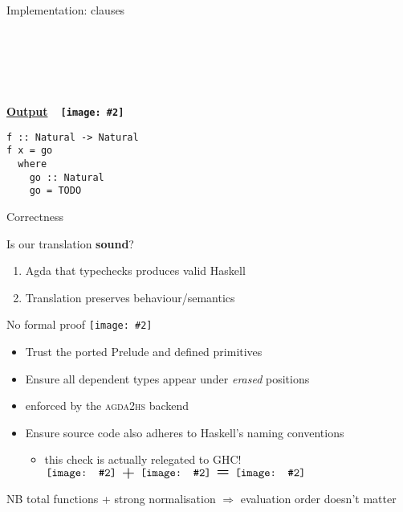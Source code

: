 \documentclass[aspectratio=169]{beamer}
\newcommand\agdatohs{\textsc{agda2hs}\xspace}
\newcommand\img[2]{\texttt{[image: \#2]}}
\newcommand\smallImg[1]{\img{1.7em}{#1}}
\newcommand*\vmid[1]{\vcenter{\hbox{#1}}}
\newcommand\agdaHsLove{%
$
\vmid{\smallImg{agda}}
\vmid{\scalebox{1.5}{\ +\ }}
\vmid{\smallImg{haskell}}
\vmid{\scalebox{1.5}{\ =\ }}
\vmid{\smallImg{heart}}
$
}
\newcommand\resetVars{
  \def\sourceRatio{.5}
  \def\zoom{1}
  \def\hsFontsize{\normalsize}
  \def\midruleL{-1cm}
  \def\midruleR{.5cm}
  \def\sourceIcon{agda}
}
\newcommand\midrule{\hspace{\midruleL}\vrule\hspace{\midruleR}}
\begin{document}
\begin{frame}[fragile]{Implementation:  clauses}
\begin{minipage}{.33\textwidth}
\begin{code}[hide]%
\>[0]\AgdaSpace{}%
\AgdaSpace{}%
\<%
\end{code}
\begin{code}%
\>[0][@{}l@{\AgdaIndent{1}}]%
\>[2]\AgdaSpace{}%
\AgdaSymbol{:}\AgdaSpace{}%
\AgdaSpace{}%
\AgdaSpace{}%
\<%
\\
%
\>[2]\AgdaSpace{}%
\AgdaSpace{}%
\AgdaSymbol{=}\AgdaSpace{}%
\<%
\\
%
\\[\AgdaEmptyExtraSkip]%
%
\>[2]\AgdaSpace{}%
\AgdaSymbol{:}\AgdaSpace{}%
\AgdaSpace{}%
\AgdaSpace{}%
\<%
\\
%
\>[2]\AgdaSpace{}%
\AgdaSpace{}%
\AgdaSymbol{=}\AgdaSpace{}%
\AgdaSpace{}%
\<%
\end{code}
\end{minipage}
\midrule
\begin{minipage}{.33\textwidth}%
\begin{center}\textbf{\underline{Output}~~\smallImg{haskell}}\end{center}
\begin{verbatim}
f :: Natural -> Natural
f x = go
  where
    go :: Natural
    go = TODO
\end{verbatim}
\end{minipage}
\resetVars
\end{frame}

\begin{frame}[fragile]{Correctness}

Is our translation \textbf{sound}?
\begin{enumerate}
\item Agda that typechecks produces valid Haskell
\item Translation preserves behaviour/semantics
\end{enumerate}
\pause
No formal proof \smallImg{sadface}
\begin{itemize}
\item Trust the ported Prelude and defined primitives
\item Ensure all dependent types appear under \textit{erased} positions
  \item enforced by the \agdatohs backend
\item Ensure source code also adheres to Haskell's naming conventions
  \begin{itemize}
  \item this check is actually relegated to GHC! \hspace{.5cm}\agdaHsLove{}
  \end{itemize}
\end{itemize}
\begin{alertblock}{NB}
total functions + strong normalisation $\Rightarrow$ evaluation order doesn't matter
\end{alertblock}
\end{frame}
\end{document}
